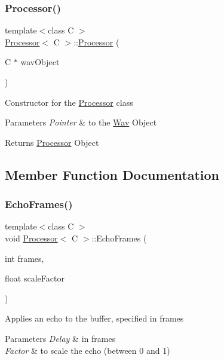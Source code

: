 \subsubsection{\texorpdfstring{Processor()}{Processor()}}
{\footnotesize\ttfamily template$<$class C $>$ \\
\hyperlink{classProcessor}{Processor}$<$ C $>$\+::\hyperlink{classProcessor}{Processor} (\begin{DoxyParamCaption}\item[{C $\ast$}]{wav\+Object }\end{DoxyParamCaption})\hspace{0.3cm}{\ttfamily [inline]}}

Constructor for the \hyperlink{classProcessor}{Processor} class


\begin{DoxyParams}{Parameters}
{\em Pointer} & to the \hyperlink{classWav}{Wav} Object \\
\hline
\end{DoxyParams}
\begin{DoxyReturn}{Returns}
\hyperlink{classProcessor}{Processor} Object 
\end{DoxyReturn}


\subsection{Member Function Documentation}
\mbox{\label{classProcessor_a351348e5bea46d7b01f2678f638918de}} 
\subsubsection{\texorpdfstring{Echo\+Frames()}{EchoFrames()}}
{\footnotesize\ttfamily template$<$class C $>$ \\
void \hyperlink{classProcessor}{Processor}$<$ C $>$\+::Echo\+Frames (\begin{DoxyParamCaption}\item[{int}]{frames,  }\item[{float}]{scale\+Factor }\end{DoxyParamCaption})\hspace{0.3cm}{\ttfamily [inline]}}

Applies an echo to the buffer, specified in frames


\begin{DoxyParams}{Parameters}
{\em Delay} & in frames \\
\hline
{\em Factor} & to scale the echo (between 0 and 1) \\
\hline
\end{DoxyParams}
\mbox{\label{classProcessor_a78eddf7400dbb916dd1a2f86604c61c8}} 
